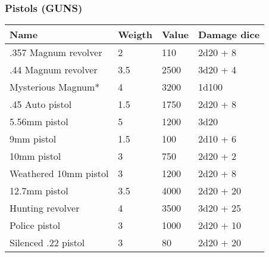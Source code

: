 
\subsubsection{Pistols (GUNS)}
\begin{longtable}{|p{4cm}|p{1.5cm}|p{1.5cm}|p{9cm}|}
\hline
\bfseries Name & \bfseries Weigth & \bfseries Value & \bfseries Damage dice \\
\hline
\endhead
.357 Magnum revolver & 2 & 110 & 2d20 + 8 \\
.44 Magnum revolver & 3.5 & 2500 & 3d20 + 4 \\
Mysterious Magnum* & 4 & 3200 & 1d100 \\
.45 Auto pistol & 1.5 & 1750 & 2d20 + 8 \\
5.56mm pistol & 5 & 1200 & 3d20 \\
9mm pistol & 1.5 & 100 & 2d10 + 6 \\
10mm pistol & 3 & 750 & 2d20 + 2 \\
Weathered 10mm pistol & 3 & 1200 & 2d20 + 8 \\
12.7mm pistol & 3.5 & 4000 & 2d20 + 20 \\
Hunting revolver & 4 & 3500 & 3d20 + 25 \\
Police pistol & 3 & 1000 & 2d20 + 10 \\
Silenced .22 pistol & 3 & 80 & 2d20 + 20 \\
\hline
\end{longtable}
